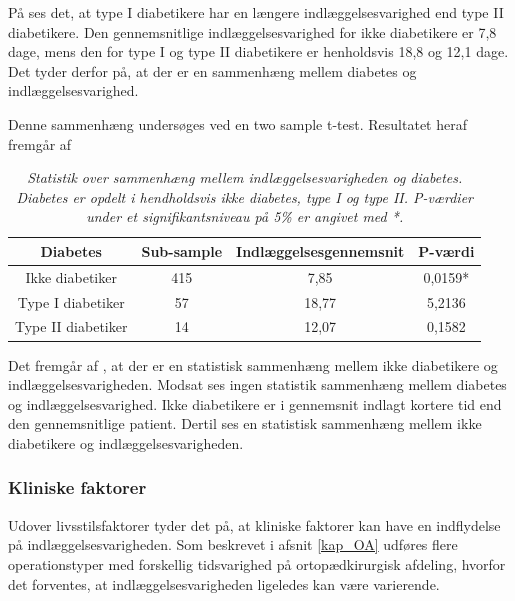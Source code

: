 \noindent
På  ses det, at type I diabetikere har en længere indlæggelsesvarighed end type II diabetikere. Den gennemsnitlige indlæggelsesvarighed for ikke diabetikere er 7,8 dage, mens den for type I og type II diabetikere er henholdsvis 18,8 og 12,1 dage. Det tyder derfor på, at der er en sammenhæng mellem diabetes og indlæggelsesvarighed. 

Denne sammenhæng undersøges ved en two sample t-test. Resultatet heraf fremgår af 

\begin{table}[H]
\centering
\begin{tabular}{|c|c|c|c|}
\hline
\textbf{Diabetes}  & \textbf{Sub-sample} & \textbf{Indlæggelsesgennemsnit} & \textbf{P-værdi} \\ \hline
Ikke diabetiker    & 415                 & 7,85                            & 0,0159*          \\ \hline
Type I diabetiker  & 57                  & 18,77                           & 5,2136           \\ \hline
Type II diabetiker & 14                  & 12,07                           & 0,1582           \\ \hline
\end{tabular}
\caption{\textit{Statistik over sammenhæng mellem indlæggelsesvarigheden og diabetes. Diabetes er opdelt i hendholdsvis ikke diabetes, type I og type II. P-værdier under et signifikantsniveau på 5\% er angivet med *.}}
\label{diabetesindlaegtab}
\end{table}

\noindent
Det fremgår af , at der er en statistisk sammenhæng mellem ikke diabetikere og indlæggelsesvarigheden. Modsat ses ingen statistik sammenhæng mellem diabetes og indlæggelsesvarighed. Ikke diabetikere er i gennemsnit indlagt kortere tid end den gennemsnitlige patient. Dertil ses en statistisk sammenhæng mellem ikke diabetikere og indlæggelsesvarigheden.

\subsubsection{Kliniske faktorer}
Udover livsstilsfaktorer tyder det på, at kliniske faktorer kan have en indflydelse på indlæggelsesvarigheden. Som beskrevet i afsnit \ref{kap_OA} udføres flere operationstyper med forskellig tidsvarighed på ortopædkirurgisk afdeling, hvorfor det forventes, at indlæggelsesvarigheden ligeledes kan være varierende. 


